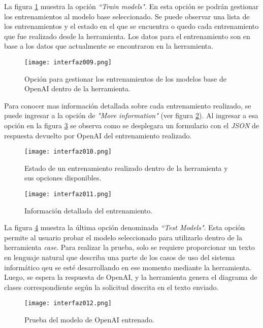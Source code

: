 La figura \ref{fig:cap3_interfaz_009} muestra la opción \textit{``Train models"}. En esta opción se podrán gestionar los entrenamientos al modelo base seleccionado. Se puede observar una lista de los entrenamientos y el estado en el que se encuentra o quedo cada entrenamiento que fue realizado desde la herramienta. Los datos para el entrenamiento son en base a los datos que actualmente se encontraron en la herramienta.  

\begin{figure}[H]  
	\centering
	\texttt{[image: interfaz009.png]} 
	\caption{Opción para gestionar los entrenamientos de los modelos base de OpenAI dentro de la herramienta.}
	\label{fig:cap3_interfaz_009}
\end{figure} 

Para conocer mas información detallada sobre cada entrenamiento realizado, se puede ingresar a la opción de \textit{"More information"} (ver figura \ref{fig:cap3_interfaz_010}). Al ingresar a esa opción en la figura \ref{fig:cap3_interfaz_011} se observa  como se desplegara un formulario con el \textit{JSON} de respuesta devuelto por OpenAI del entrenamiento realizado. 

\begin{figure}[H]  
	\centering
	\texttt{[image: interfaz010.png]} 
	\caption{Estado de un entrenamiento realizado dentro de la herramienta y sus opciones disponibles.}
	\label{fig:cap3_interfaz_010}
\end{figure} 

\begin{figure}[H]  
	\centering
	\texttt{[image: interfaz011.png]} 
	\caption{Información detallada del entrenamiento.}
	\label{fig:cap3_interfaz_011}
\end{figure}

La figura \ref{fig:cap3_interfaz_012} muestra la última opción denominada \textit{``Test Models"}. Esta opción permite al usuario probar el modelo seleccionado para utilizarlo dentro de la herramienta \textit{case}. Para realizar la prueba, solo se requiere proporcionar un texto en lenguaje natural que describa una parte de los casos de uso del sistema informático qeu se esté desarrollando en ese momento mediante la herramienta. Luego, se espera la respuesta de OpenAI, y la herramienta genera el diagrama de clases correspondiente según la solicitud descrita en el texto enviado.
 
 \begin{figure}[H]  
 	\centering
 	\texttt{[image: interfaz012.png]} 
 	\caption{Prueba del modelo de OpenAI entrenado.}
 	\label{fig:cap3_interfaz_012}
 \end{figure}

